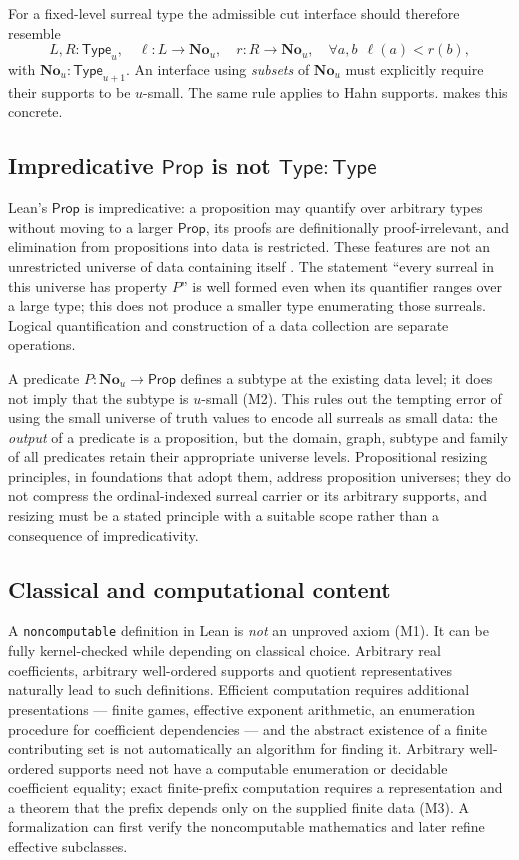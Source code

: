 \documentclass[11pt,letterpaper]{article}
\numberwithin{equation}{section}
\theoremstyle{definition}
\theoremstyle{remark}
\newcommand{\No}{\mathbf{No}}
\newcommand{\Type}{\mathsf{Type}}
\newcommand{\Prop}{\mathsf{Prop}}
\begin{document}
For a fixed-level surreal type the admissible cut interface should therefore
resemble
\[
 L,R:\Type_u,\quad \ell:L\to\No_u,\quad r:R\to\No_u,
 \quad\forall a,b\ \ \ell(a)<r(b),
\]
with $\No_u:\Type_{u+1}$. An interface using \emph{subsets} of $\No_u$ must
explicitly require their supports to be $u$-small. The same rule applies to Hahn
supports.  makes this concrete.

\subsection{Impredicative \texorpdfstring{$\Prop$}{Prop} is not \texorpdfstring{$\Type:\Type$}{Type : Type}}
\label{found:sub:prop}
Lean's $\Prop$ is impredicative: a proposition may quantify over arbitrary types
without moving to a larger $\Prop$, its proofs are definitionally
proof-irrelevant, and elimination from propositions into data is restricted.
These features are not an unrestricted universe of data containing itself
\cite{found:LeanPropositions,found:LeanUniverses}. The statement ``every surreal
in this universe has property $P$'' is well formed even when its quantifier
ranges over a large type; this does not produce a smaller type enumerating those
surreals. Logical quantification and construction of a data collection are
separate operations.

A predicate $P:\No_u\to\Prop$ defines a subtype at the existing data level; it
does not imply that the subtype is $u$-small (M2). This rules out the tempting
error of using the small universe of truth values to encode all surreals as
small data: the \emph{output} of a predicate is a proposition, but the domain,
graph, subtype and family of all predicates retain their appropriate universe
levels. Propositional resizing principles, in foundations that adopt them,
address proposition universes; they do not compress the ordinal-indexed surreal
carrier or its arbitrary supports, and resizing must be a stated principle with
a suitable scope rather than a consequence of impredicativity.

\subsection{Classical and computational content}
\label{found:sub:noncomputable}
A \texttt{noncomputable} definition in Lean is \emph{not} an unproved axiom
(M1). It can be fully kernel-checked while depending on classical choice.
Arbitrary real coefficients, arbitrary well-ordered supports and quotient
representatives naturally lead to such definitions. Efficient computation
requires additional presentations --- finite games, effective exponent
arithmetic, an enumeration procedure for coefficient dependencies --- and the
abstract existence of a finite contributing set is not automatically an
algorithm for finding it. Arbitrary well-ordered supports need not have a
computable enumeration or decidable coefficient equality; exact finite-prefix
computation requires a representation and a theorem that the prefix depends only
on the supplied finite data (M3). A formalization can first verify the
noncomputable mathematics and later refine effective subclasses.
\end{document}
